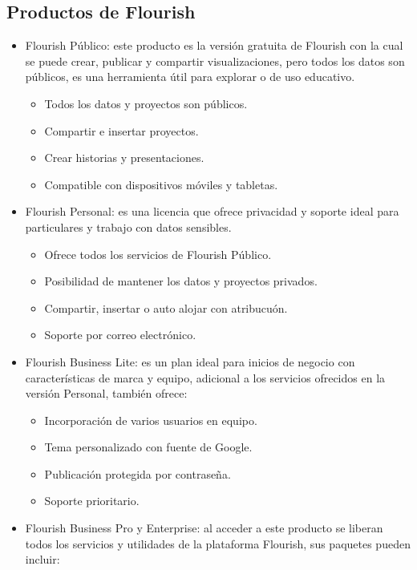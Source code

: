 \documentclass[
]{book}
\providecommand{\tightlist}{%
  \setlength{\itemsep}{0pt}\setlength{\parskip}{0pt}}
\begin{document}
\hypertarget{productos-de-flourish}{%
\subsection{Productos de Flourish}\label{productos-de-flourish}}

\begin{itemize}
\tightlist
\item
  Flourish Público: este producto es la versión gratuita de Flourish con la cual se puede crear, publicar y compartir visualizaciones, pero todos los datos son públicos, es una herramienta útil para explorar o de uso educativo.

  \begin{itemize}
  \tightlist
  \item
    Todos los datos y proyectos son públicos.
  \item
    Compartir e insertar proyectos.
  \item
    Crear historias y presentaciones.
  \item
    Compatible con dispositivos móviles y tabletas.
  \end{itemize}
\item
  Flourish Personal: es una licencia que ofrece privacidad y soporte ideal para particulares y trabajo con datos sensibles.

  \begin{itemize}
  \tightlist
  \item
    Ofrece todos los servicios de Flourish Público.
  \item
    Posibilidad de mantener los datos y proyectos privados.
  \item
    Compartir, insertar o auto alojar con atribucuón.
  \item
    Soporte por correo electrónico.
  \end{itemize}
\item
  Flourish Business Lite: es un plan ideal para inicios de negocio con características de marca y equipo, adicional a los servicios ofrecidos en la versión Personal, también ofrece:

  \begin{itemize}
  \tightlist
  \item
    Incorporación de varios usuarios en equipo.
  \item
    Tema personalizado con fuente de Google.
  \item
    Publicación protegida por contraseña.
  \item
    Soporte prioritario.
  \end{itemize}
\item
  Flourish Business Pro y Enterprise: al acceder a este producto se liberan todos los servicios y utilidades de la plataforma Flourish, sus paquetes pueden incluir:


\end{itemize}
\end{document}
